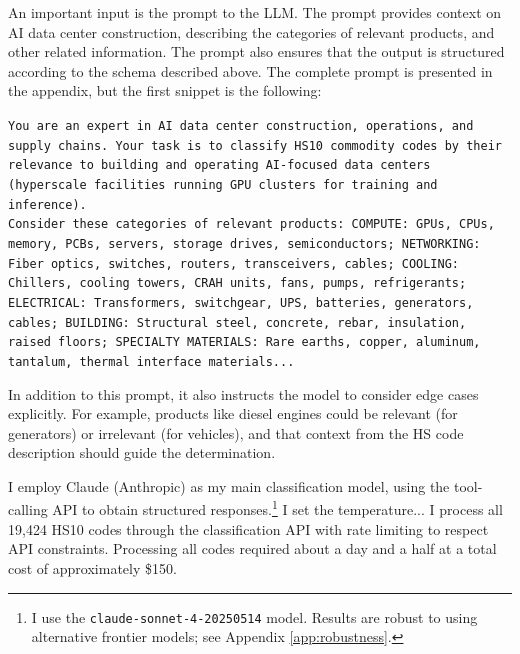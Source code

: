 \documentclass[12pt,pdftex]{article}
\newenvironment{prompt}{\par\medskip\noindent}{\par\medskip}
\begin{document}
\begin{onehalfspacing}
An important input is the prompt to the LLM. The prompt provides context on AI data center construction, describing the categories of relevant products, and other related information. The prompt also ensures that the output is structured according to the schema described above. The complete prompt is presented in the appendix, but the first snippet is the following:
\begin{prompt}
\texttt{You are an expert in AI data center construction, operations, and supply chains. Your task is to classify HS10 commodity codes by their relevance to building and operating AI-focused data centers (hyperscale facilities running GPU clusters for training and inference).}\\

\texttt{Consider these categories of relevant products: COMPUTE: GPUs, CPUs, memory, PCBs, servers, storage drives, semiconductors; NETWORKING: Fiber optics, switches, routers, transceivers, cables; COOLING: Chillers, cooling towers, CRAH units, fans, pumps, refrigerants; ELECTRICAL: Transformers, switchgear, UPS, batteries, generators, cables; BUILDING: Structural steel, concrete, rebar, insulation, raised floors; SPECIALTY MATERIALS: Rare earths, copper, aluminum, tantalum, thermal interface materials...}
\end{prompt}
In addition to this prompt, it also instructs the model to consider edge cases explicitly. For example, products like diesel engines could be relevant (for generators) or irrelevant (for vehicles), and that context from the HS code description should guide the determination.

I employ Claude (Anthropic) as my main classification model, using the tool-calling API to obtain structured responses.\footnote{I use the \texttt{claude-sonnet-4-20250514} model. Results are robust to using alternative frontier models; see Appendix \ref{app:robustness}.} I set the temperature... I process all 19,424 HS10 codes through the classification API with rate limiting to respect API constraints. Processing all codes required about a day and a half at a total cost of approximately \$150.






\end{onehalfspacing}
\end{document}
